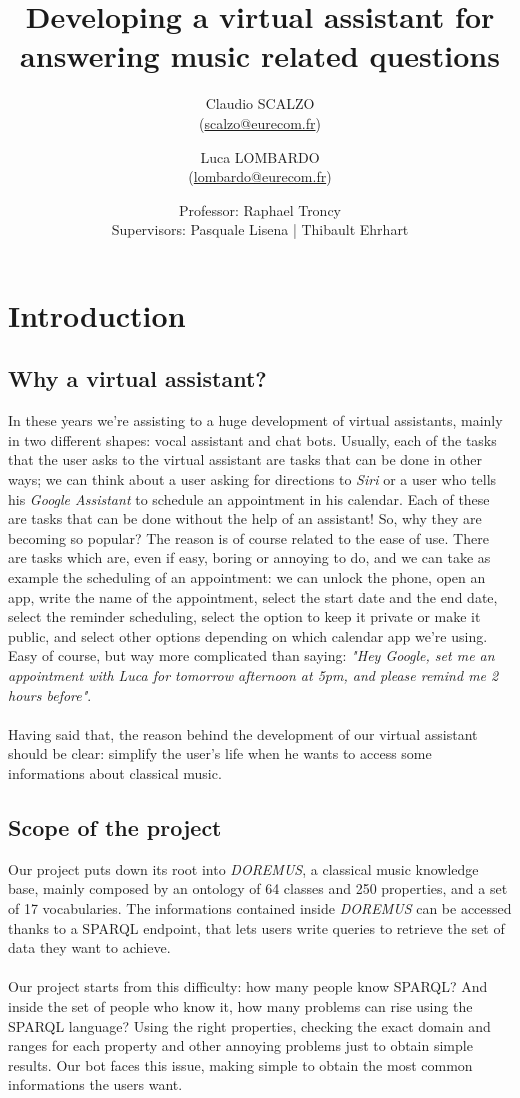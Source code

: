 \documentclass[a4paper,12pt]{report}
\title{Developing a virtual assistant for answering music related questions}
\author{Claudio SCALZO \\ (\href{mailto:scalzo@eurecom.fr}{scalzo@eurecom.fr}) \and Luca LOMBARDO \\ (\href{mailto:lombardo@eurecom.fr}{lombardo@eurecom.fr}) }
\date{Professor: Raphael Troncy\\Supervisors: Pasquale Lisena | Thibault Ehrhart}
\begin{document}
\maketitle
\tableofcontents

\chapter{Introduction}
	\section{Why a virtual assistant?}
	In these years we're assisting to a huge development of virtual assistants, mainly in two different shapes: vocal assistant and chat bots. Usually, each of the tasks that the user asks to the virtual assistant are tasks that can be done in other ways; we can think about a user asking for directions to \textit{Siri} or a user who tells his \textit{Google Assistant} to schedule an appointment in his calendar. Each of these are tasks that can be done without the help of an assistant! So, why they are becoming so popular? The reason is of course related to the ease of use. There are tasks which are, even if easy, boring or annoying to do, and we can take as example the scheduling of an appointment: we can unlock the phone, open an app, write the name of the appointment, select the start date and the end date, select the reminder scheduling, select the option to keep it private or make it public, and select other options depending on which calendar app we're using. Easy of course, but way more complicated than saying: \textit{"Hey Google, set me an appointment with Luca for tomorrow afternoon at 5pm, and please remind me 2 hours before"}.\\\\
	Having said that, the reason behind the development of our virtual assistant should be clear: simplify the user's life when he wants to access some informations about classical music.
	
	\section{Scope of the project}
	Our project puts down its root into \textit{DOREMUS}\cite{doremus}, a classical music knowledge base, mainly composed by an ontology of 64 classes and 250 properties, and a set of 17 vocabularies. The informations contained inside \textit{DOREMUS} can be accessed thanks to a SPARQL endpoint, that lets users write queries to retrieve the set of data they want to achieve.\\\\
	Our project starts from this difficulty: how many people know SPARQL? And inside the set of people who know it, how many problems can rise using the SPARQL language? Using the right properties, checking the exact domain and ranges for each property and other annoying problems just to obtain simple results. Our bot faces this issue, making simple to obtain the most common informations the users want.
	
\end{document}
